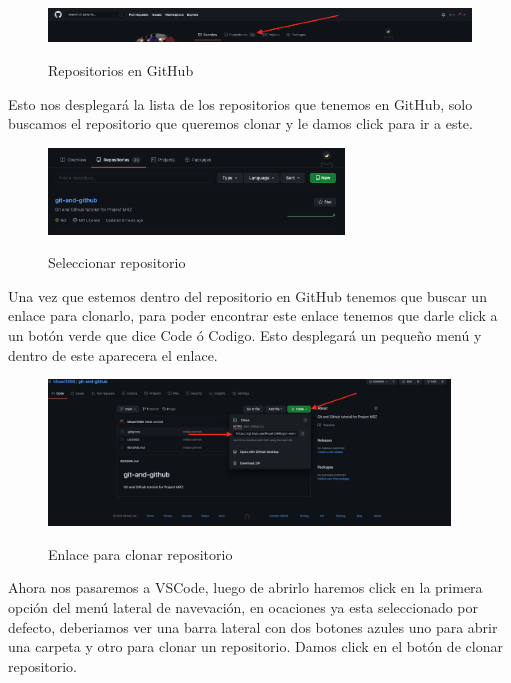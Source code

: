 \documentclass[11pt, oneside]{article}
\begin{document}
\begin{figure}[H]
  \centering
  \caption{Repositorios en GitHub}
  \includegraphics[width=\textwidth]{./img/github-new-repo-6.png}
  \label{fig:github-new-repo-6}
\end{figure}

Esto nos desplegará la lista de los repositorios que tenemos en GitHub, solo buscamos el repositorio que queremos clonar y le damos click para ir a este.

\begin{figure}[H]
  \centering
  \caption{Seleccionar repositorio}
  \includegraphics[width=0.70\textwidth]{./img/github-new-repo-7.png}
  \label{fig:github-new-repo-7}
\end{figure}

Una vez que estemos dentro del repositorio en GitHub tenemos que buscar un enlace para clonarlo, para poder encontrar este enlace tenemos que darle click a un botón verde que dice Code ó Codigo. Esto desplegará un pequeño menú y dentro de este aparecera el enlace.

\begin{figure}[H]
  \centering
  \caption{Enlace para clonar repositorio}
  \includegraphics[width=0.95\textwidth]{./img/github-new-repo-8.png}
  \label{fig:github-new-repo-8}
\end{figure}

Ahora nos pasaremos a VSCode, luego de abrirlo haremos click en la primera opción del menú lateral de navevación, en ocaciones ya esta seleccionado por defecto, deberiamos ver una barra lateral con dos botones azules uno para abrir una carpeta y otro para clonar un repositorio. Damos click en el botón de clonar repositorio.
\end{document}
